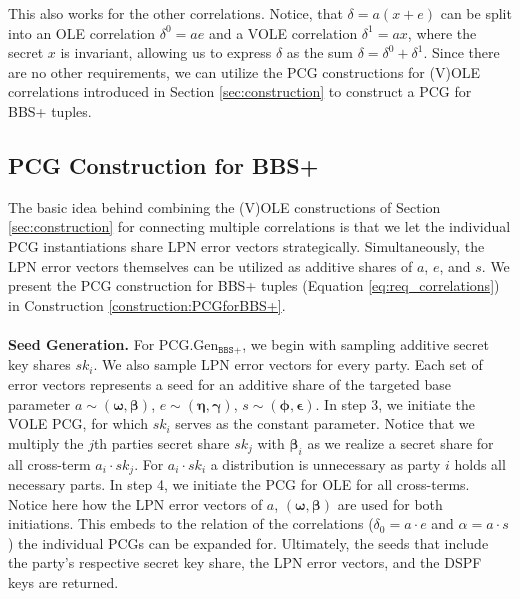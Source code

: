 This also works for the other correlations. Notice, that $\delta = a(x+e)$ can be split into an OLE correlation $\delta^0 = ae$ and a VOLE correlation $\delta^1 = ax$, where the secret $x$ is invariant, allowing us to express $\delta$ as the sum $\delta = \delta^0 + \delta^1$. Since there are no other requirements, we can utilize the PCG constructions for (V)OLE correlations introduced in Section \ref{sec:construction} to construct a PCG for BBS+ tuples.

\subsection{PCG Construction for BBS+}
The basic idea behind combining the (V)OLE constructions of Section \ref{sec:construction} for connecting multiple correlations is that we let the individual PCG instantiations share LPN error vectors strategically. Simultaneously, the LPN error vectors themselves can be utilized as additive shares of $a$, $e$, and $s$. We present the PCG construction for BBS+ tuples (Equation \ref{eq:req_correlations}) in Construction \ref{construction:PCGforBBS+}.
\\\\
\textbf{Seed Generation.} For PCG.Gen$_{\texttt{BBS+}}$, we begin with sampling additive secret key shares $sk_i$. We also sample LPN error vectors for every party. Each set of error vectors represents a seed for an additive share of the targeted base parameter $a \sim (\boldsymbol{\omega}, \boldsymbol{\beta})$, $e \sim (\boldsymbol{\eta}, \boldsymbol{\gamma})$, $s \sim (\boldsymbol{\phi}, \boldsymbol{\epsilon})$. In step 3, we initiate the VOLE PCG, for which $sk_i$ serves as the constant parameter. Notice that we multiply the $j$th parties secret share $sk_j$ with $\boldsymbol{\beta}_i$ as we realize a secret share for all cross-term $a_i\cdot sk_j$. For $a_i\cdot sk_i$ a distribution is unnecessary as party $i$ holds all necessary parts. In step 4, we initiate the PCG for OLE for all cross-terms. Notice here how the LPN error vectors of $a$, $(\boldsymbol{\omega}, \boldsymbol{\beta})$ are used for both initiations. This embeds to the relation of the correlations ($\delta_0 = a\cdot e$ and $\alpha = a\cdot s$) the individual PCGs can be expanded for. Ultimately, the seeds that include the party's respective secret key share, the LPN error vectors, and the DSPF keys are returned.
\\\\
